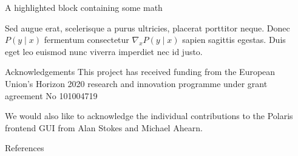 \documentclass[final]{beamer}
\newlength{\sepwidth}
\newlength{\colwidth}
\newcommand{\separatorcolumn}{\begin{column}{\sepwidth}\end{column}}
\begin{document}
\begin{frame}[t]
\begin{columns}[t]
\begin{column}{\colwidth}
\begin{exampleblock}{A highlighted block containing some math}

                    Sed augue erat, scelerisque a purus ultricies, placerat porttitor neque.
                    Donec $P(y \mid x)$ fermentum consectetur $\nabla_x P(y \mid x)$ sapien
                    sagittis egestas. Duis eget leo euismod nunc viverra imperdiet nec id
                    justo.

                \end{exampleblock}

                \begin{block}{Acknowledgements}
                    This project has received funding from the European Union’s Horizon 2020 research and
                    innovation programme under grant agreement No 101004719

                    We would also like to acknowledge the individual contributions to the Polaris frontend
                    GUI from Alan Stokes and Michael Ahearn.
                \end{block}



                \begin{block}{References}

                    \nocite{*}
                    \footnotesize{}

                \end{block}

            \end{column}
            \separatorcolumn
        \end{columns}
    \end{frame}
\end{document}
